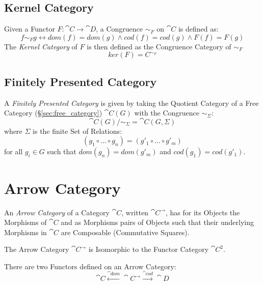 \subsection{Kernel Category}\label{sec:kernel_category}

Given a Functor $F : \cat{C} \rightarrow \cat{D}$, a Congruence
$\sim_F$ on $\cat{C}$ is defined as:
\[
  f \sim_F g \leftrightarrow dom(f) = dom(g) \wedge cod(f) = cod(g)
  \wedge F(f) = F(g)
\]
The \emph{Kernel Category} of $F$ is then defined as the Congruence
Category of $\sim_F$
\[
  ker(F) = C^{\sim_F}
\]



\subsection{Finitely Presented Category}
\label{sec:finitely_presented}

A \emph{Finitely Presented Category} is given by taking the Quotient
Category of a Free Category (\S\ref{sec:free_category})
$\cat{C}(G)$ with the Congruence $\sim_\Sigma$:
\[
  \cat{C}(G) / \sim_{\Sigma} = \cat{C}(G,\Sigma)
\]
where $\Sigma$ is the finite Set of Relations:
\[
  (g_1 \circ \ldots \circ g_n) = (g'_1 \circ \ldots \circ g'_m)
\]
for all $g_i \in G$ such that $dom(g_n) = dom(g'_m)$ and $cod(g_1) =
cod(g'_1)$.



\section{Arrow Category}\label{sec:arrow_category}

An \emph{Arrow Category} of a Category $\cat{C}$, written
$\cat{C^{\rightarrow}}$, has for its Objects the Morphisms of
$\cat{C}$ and as Morphisms pairs of Objects such that their
underlying Morphisms in $\cat{C}$ are Composable (Commutative
Squares).

The Arrow Category $\cat{C}^\rightarrow$ is Isomorphic to the
Functor Category $\cat{C^2}$.

There are two Functors defined on an Arrow Category:
\[
  \cat{C} \xleftarrow{\cat{dom}} \cat{C}^\rightarrow
  \xrightarrow{\cat{cod}} \cat{D}
\]

